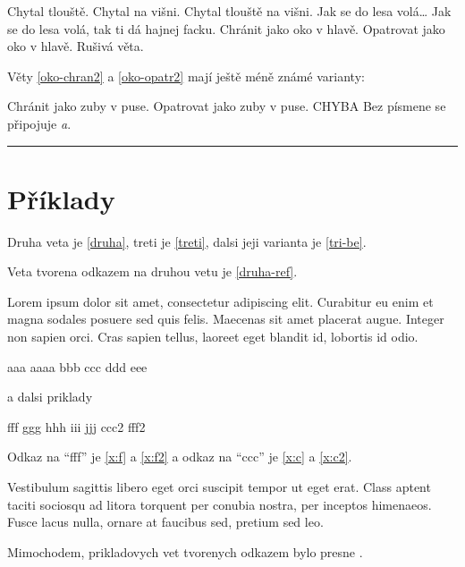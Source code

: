 \documentclass{pbmlbook}
\begin{document}
\begin{exe}
\ex  Chytal tlouště.
\exa Chytal na višni.
\exa Chytal tlouště na višni.
\ex  Jak se do lesa volá\ldots
\exa Jak se do lesa volá, tak ti dá hajnej facku.
\ex  \label{oko-chran2}Chránit jako oko v hlavě.
\exa \label{oko-opatr2}Opatrovat jako oko v hlavě.
\ex  \label{preruseni2}Rušivá věta. 
\end{exe}

Věty \ref{oko-chran2} a \ref{oko-opatr2}
mají ještě méně známé varianty:
\begin{exe}
 Chránit jako zuby v puse.
 Opatrovat jako zuby v puse.
 CHYBA
    Bez písmene se připojuje \textit{a}.
\end{exe}


\hrule
\setcounter{lastarab}{0}
\newpage

\section*{Příklady}

Druha veta je \ref{druha}, treti je \ref{treti},
dalsi jeji varianta je \ref{tri-be}.

Veta tvorena odkazem na druhou vetu je \ref{druha-ref}.

Lorem ipsum dolor sit amet, consectetur adipiscing elit. Curabitur eu enim et
magna sodales posuere sed quis felis. Maecenas sit amet placerat augue. Integer
non sapien orci. Cras sapien tellus, laoreet eget blandit id, lobortis id odio.


\begin{exe}
\ex aaa
\ex aaaa
\exa bbb
\exa \label{x:c} ccc
\ex ddd
\exa eee
\end{exe}

a dalsi priklady

\begin{exe}
\ex \label{x:f} fff
\exa ggg
\exa hhh
\ex iii
\exa jjj
 \label{x:c2} ccc2
 \label{x:f2} fff2
\end{exe}

Odkaz na ``fff'' je \ref{x:f} a \ref{x:f2} a
odkaz na ``ccc'' je \ref{x:c} a \ref{x:c2}.

Vestibulum sagittis libero eget orci suscipit tempor ut eget erat. Class aptent
taciti sociosqu ad litora torquent per conubia nostra, per inceptos himenaeos.
Fusce lacus nulla, ornare at faucibus sed, pretium sed leo.

Mimochodem, prikladovych vet tvorenych odkazem bylo presne .
\end{document}

